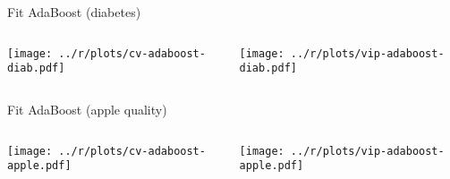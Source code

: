 

\begin{frame}{Fit AdaBoost (diabetes)}




\begin{columns}[T]
\hspace{-2.3em}\begin{column}{0.515\textwidth}
	\texttt{[image: ../r/plots/cv-adaboost-diab.pdf]}
\end{column}
\hspace{-1.3ex}\begin{column}{0.515\textwidth}
	\texttt{[image: ../r/plots/vip-adaboost-diab.pdf]}
\end{column}
\end{columns}

\end{frame}

\begin{frame}{Fit AdaBoost (apple quality)}

\begin{columns}[T]
\hspace{-2.3em}\begin{column}{0.515\textwidth}
	\texttt{[image: ../r/plots/cv-adaboost-apple.pdf]}
\end{column}
\hspace{-1.3ex}\begin{column}{0.515\textwidth}
	\texttt{[image: ../r/plots/vip-adaboost-apple.pdf]}
\end{column}
\end{columns}

\end{frame}


